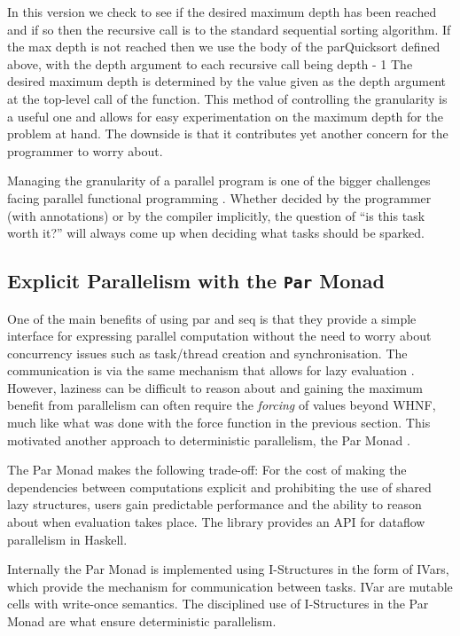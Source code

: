    In this version we check to see if the desired maximum depth has been
reached and if so then the recursive call is to the standard sequential sorting
algorithm. If the max depth is not reached then we use the body of the
parQuicksort defined above, with the depth argument to each recursive call being
\<depth - 1\> The desired maximum depth is determined by the value given as
the depth argument at the top-level call of the function. This method of
controlling the granularity is a useful one and allows for easy experimentation
on the maximum depth for the problem at hand. The downside is that it
contributes yet another concern for the programmer to worry about.


Managing the granularity of a parallel program is one of the bigger challenges
facing parallel functional programming \citep{SPJ:PIFPL}. Whether decided by
the programmer (with annotations) or by the compiler implicitly, the question
of ``is this task worth it?'' will always come up when deciding what tasks
should be sparked.

\subsection{Explicit Parallelism with the \texttt{Par} Monad}

One of the main benefits of using \<par\> and \<seq\> is that they provide a
simple interface for expressing parallel computation without the need to worry
about concurrency issues such as task/thread creation and synchronisation. The
communication is via the same mechanism that allows for lazy evaluation
\citep{SPJ:PIFPL}. However, laziness can be difficult to reason about and
gaining the maximum benefit from parallelism can often require the
\emph{forcing} of values beyond WHNF, much like what was done with the
\<force\> function in the previous section.  This motivated another approach to
deterministic parallelism, the \<Par\> Monad \citep{marlow2011monad}.

The \<Par\> Monad makes the following trade-off: For the cost of making the
dependencies between computations explicit and prohibiting the use of shared
lazy structures, users gain predictable performance and the ability to reason
about when evaluation takes place. The library provides an API for dataflow
parallelism in Haskell.

Internally the \<Par\> Monad is implemented using I-Structures
\citep{Arvind:IStructures} in the form of \<IVar\>s, which provide the
mechanism for communication between tasks. \<IVar\> are mutable cells with
write-once semantics.  The disciplined use of I-Structures in the \<Par\> Monad
are what ensure deterministic parallelism.

